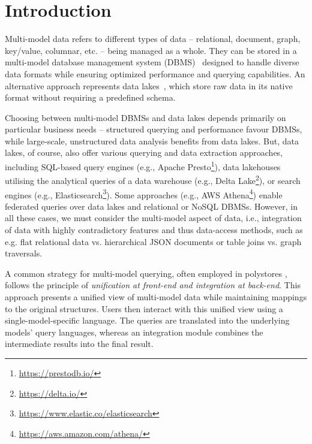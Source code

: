 
\section{Introduction}

Multi-model data refers to different types of data -- relational, document, graph, key/value, columnar, etc. -- being managed as a whole. They can be stored in a multi-model database management system (DBMS)~\citep{CSUR-Jiaheng} designed to handle diverse data formats while ensuring optimized performance and querying capabilities. An alternative approach represents data lakes~\citep{AWSDataLake}, which store raw data in its native format without requiring a predefined schema.

Choosing between multi-model DBMSs and data lakes depends primarily on particular business needs -- structured querying and performance favour DBMSs, while large-scale, unstructured data analysis benefits from data lakes. But, data lakes, of course, also offer various querying and data extraction approaches, including SQL-based query engines (e.g., Apache Presto\footnote{\url{https://prestodb.io/}}), data lakehouses utilising the analytical queries of a data warehouse (e.g., Delta Lake\footnote{\url{https://delta.io/}}), or search engines (e.g., Elasticsearch\footnote{\url{https://www.elastic.co/elasticsearch}}). Some approaches (e.g., AWS Athena\footnote{\url{https://aws.amazon.com/athena/}})  enable federated queries over data lakes and relational or NoSQL DBMSs. 
However, in all these cases, we must consider the multi-model aspect of data, i.e., integration of data with highly contradictory features and thus data-access methods, such as e.g. flat relational data vs. hierarchical JSON documents or table joins vs. graph traversals. 

A common strategy for multi-model querying, often employed in polystores \citep{conf/bigdataconf/TanCGM17}, follows the principle of \textit{unification at front-end and integration at back-end}. This approach presents a unified view of multi-model data while maintaining mappings to the original structures. Users then interact with this unified view using a single-model-specific language. The queries are translated into the underlying models' query languages, whereas an integration module combines the intermediate results into the final result.

